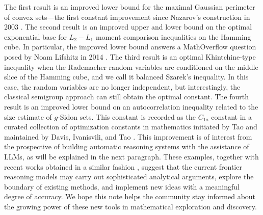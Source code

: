 \documentclass[11pt]{article}
\begin{document}
The first result is an improved lower bound for the maximal Gaussian perimeter of convex sets—the first constant improvement since Nazarov's construction in 2003 \cite{Nazarov2003}. The second result is an improved upper and lower bound on the optimal exponential base for $L_2-L_1$ moment comparison inequalities on the Hamming cube. In particular, the improved lower bound answers a MathOverflow question posed by Noam Lifshitz in 2014 \cite{MO184286}. The third result is an optimal Khintchine-type inequality when the Rademacher random variables are conditioned on the middle slice of the Hamming cube, and we call it balanced Szarek's inequality. In this case, the random variables are no longer independent, but interestingly, the classical semigroup approach can still obtain the optimal constant. The fourth result is an improved lower bound on an autocorrelation inequality related to the size estimate of $g$-Sidon sets. This constant is recorded as the $C_{1a}$ constant in a curated collection of optimization constants in mathematics initiated by Tao \cite{Tao26} and maintained by Davis, Ivanisvili, and Tao \cite{OptConstC1a}. This improvement is of interest from the prospective of  building automatic reasoning systems with the assistance of LLMs, as will be explained in the next paragraph. These examples, together with recent works obtained in a similar fashion \cite{IvanisviliXie25,BubeckCoesterEldanGowersLeeLupsascaSawhneyScherrerSellkeSpearsUnutmazWeilYinZhivotovskiy25,FengTrinhBinghamKangZhangKimBarretoSchildkrautJungSeoPaganoChervonyiHwangHouGukovTsaiChoiJinLiWuShiuShihLeLuong26, WoodruffCohenAddadJainMaoZuoBateniBranzeiBrennerChenFengFortnowFuGuanHadizadehHajiaghayiJafariRavizJavanmardKarthikKawarabayashiKumarLattanziLeeLiPanageasPaparasPrzybockiSubercaseauxSvenssonTaherijamWuYogevZadimoghaddamZhouMatiasManyikaMirrokni26,JuGaoJiangWuSunChenYWangYWangZWangHePWuXiaoLiuDaiDong26}, suggest that the current frontier reasoning models may carry out sophisticated analytical arguments, explore the boundary of existing methods, and implement new ideas with a meaningful degree of accuracy. We hope this note helps the community stay informed about the growing power of these new tools in mathematical exploration and discovery.
\end{document}
